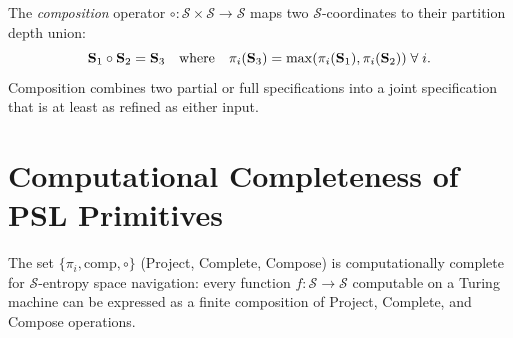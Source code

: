\begin{definition}
\label{def:compose}
The \emph{composition} operator $\circ: \mathcal{S} \times \mathcal{S} \to \mathcal{S}$
maps two $\mathcal{S}$-coordinates to their partition depth union:
\begin{equation}
  \mathbf{S}_1 \circ \mathbf{S}_2 = \mathbf{S}_3
    \quad\text{where}\quad
  \pi_i(\mathbf{S}_3) = \max(\pi_i(\mathbf{S}_1), \pi_i(\mathbf{S}_2))
  \;\forall\; i.
  \label{eq:compose}
\end{equation}
Composition combines two partial or full specifications into a joint
specification that is at least as refined as either input.
\end{definition}

\section{Computational Completeness of PSL Primitives}
\label{sec:completeness}

\begin{theorem}
\label{thm:completeness}
The set $\{\pi_i, \mathrm{comp}, \circ\}$ (Project, Complete, Compose)
is computationally complete for $\mathcal{S}$-entropy space navigation:
every function $f: \mathcal{S} \to \mathcal{S}$ computable on a Turing
machine can be expressed as a finite composition of Project, Complete,
and Compose operations.
\end{theorem}

